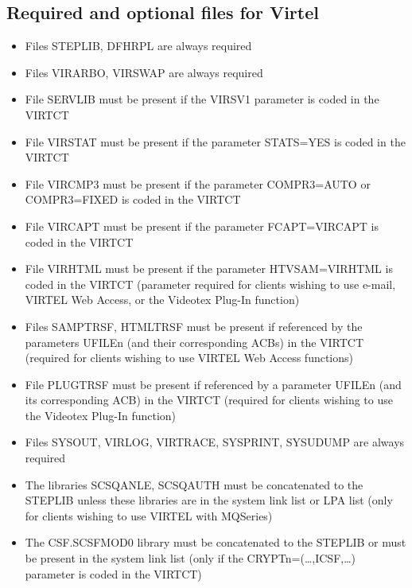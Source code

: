 \documentclass[letterpaper,10pt,english]{sphinxmanual}
\begin{document}
\subsection{Required and optional files for Virtel}
\label{\detokenize{Installation_Guide:required-and-optional-files-for-virtel}}\begin{itemize}
\item {} 
Files STEPLIB, DFHRPL are always required

\item {} 
Files VIRARBO, VIRSWAP are always required

\item {} 
File SERVLIB must be present if the VIRSV1 parameter is coded in the VIRTCT

\item {} 
File VIRSTAT must be present if the parameter STATS=YES is coded in the VIRTCT

\item {} 
File VIRCMP3 must be present if the parameter COMPR3=AUTO or COMPR3=FIXED is coded in the VIRTCT

\item {} 
File VIRCAPT must be present if the parameter FCAPT=VIRCAPT is coded in the VIRTCT

\item {} 
File VIRHTML must be present if the parameter HTVSAM=VIRHTML is coded in the VIRTCT (parameter required for clients wishing to use e-mail, VIRTEL Web Access, or the Videotex Plug-In function)

\item {} 
Files SAMPTRSF, HTMLTRSF must be present if referenced by the parameters UFILEn (and their corresponding ACBs) in the VIRTCT (required for clients wishing to use VIRTEL Web Access functions)

\item {} 
File PLUGTRSF must be present if referenced by a parameter UFILEn (and its corresponding ACB) in the VIRTCT (required for clients wishing to use the Videotex Plug-In function)

\item {} 
Files SYSOUT, VIRLOG, VIRTRACE, SYSPRINT, SYSUDUMP are always required

\item {} 
The libraries SCSQANLE, SCSQAUTH must be concatenated to the STEPLIB unless these libraries are in the system link list or LPA list (only for clients wishing to use VIRTEL with MQSeries)

\item {} 
The CSF.SCSFMOD0 library must be concatenated to the STEPLIB or must be present in the system link list (only if the CRYPTn=(…,ICSF,…) parameter is coded in the VIRTCT)

\end{itemize}
\end{document}
